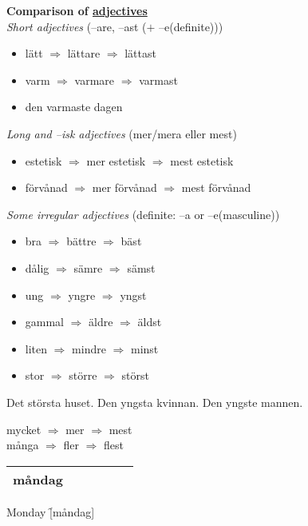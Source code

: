 
\begin{flushleft}
    \textbf{Comparison of \underline{adjectives}} \\
    \textsl{Short adjectives} (--are, --ast ($+$ --e(definite)))
    \begin{itemize}
        \item lätt $\Rightarrow$ lättare $\Rightarrow$ lättast
        \item varm $\Rightarrow$ varmare $\Rightarrow$ varmast
        \item den varmaste dagen
    \end{itemize}

    \textsl{Long and --isk adjectives} (mer/mera eller mest)
    \begin{itemize}
        \item estetisk $\Rightarrow$ mer estetisk $\Rightarrow$ mest estetisk
        \item förvånad $\Rightarrow$ mer förvånad $\Rightarrow$ mest förvånad
    \end{itemize}

    \textsl{Some irregular adjectives} (definite: --a or --e(masculine))
    \begin{itemize}
        \item bra $\Rightarrow$ bättre $\Rightarrow$ bäst
        \item dålig $\Rightarrow$ sämre $\Rightarrow$ sämst
        \item ung $\Rightarrow$ yngre $\Rightarrow$ yngst
        \item gammal $\Rightarrow$ äldre $\Rightarrow$ äldst
        \item liten $\Rightarrow$ mindre $\Rightarrow$ minst
        \item stor $\Rightarrow$ större $\Rightarrow$ störst
    \end{itemize}
    Det största huset. Den yngsta kvinnan. Den yngste mannen.

    mycket $\Rightarrow$ mer $\Rightarrow$ mest \\
    många $\Rightarrow$ fler $\Rightarrow$ flest
\end{flushleft}

\begin{center}
    \begin{tabular}{|c c c c c c|}
        \hline
        måndag &&&&& \\
        \hline
    \end{tabular}
\end{center}

\begin{questions}
    \begin{multicols}{2}
        \raggedcolumns
        \question Monday \f[måndag]
    \end{multicols}
\end{questions}